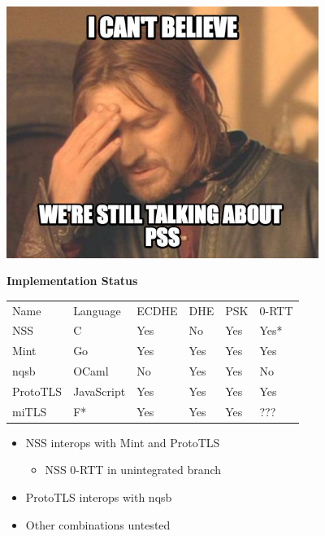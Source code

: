 \documentclass[helvetica]{seminar}
\newcommand{\heading}[1]{%
  \begin{center} 
    \large\bf 
    #1 
  \end{center} 
  \vspace{.4 in}}
\begin{document}
\begin{slide}
\includegraphics[width=4in]{851483}

\end{slide}


\begin{slide}
\heading{Implementation Status}

\begin{tabular}{l l l l l l}
Name & Language & ECDHE & DHE & PSK & 0-RTT \\
NSS 	& C & Yes & No & Yes & Yes* \\
Mint &	Go & Yes & Yes & Yes & Yes \\
nqsb & OCaml & No & Yes & Yes & No \\
ProtoTLS & JavaScript & Yes & Yes & Yes & Yes \\
miTLS &	F* & Yes & Yes & Yes & ??? \\
\end{tabular}

\vspace{2ex}

\begin{itemize}
\item NSS interops with Mint and ProtoTLS
  \begin{itemize}
  \item NSS 0-RTT in unintegrated branch
  \end{itemize}
\item ProtoTLS interops with nqsb
\item Other combinations untested
\end{itemize}

\end{slide}
\end{document}

